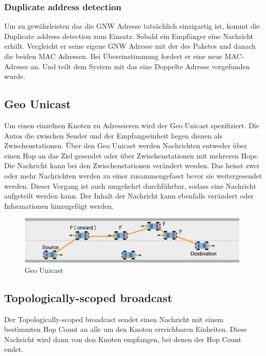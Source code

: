 \subsubsection{Duplicate address detection}
Um zu gewährleisten das die \acl{GNW} Adresse tatsächlich einzigartig ist, kommt die Duplicate address detection zum Einsatz. Sobald ein Empfänger eine Nachricht erhält. Vergleicht er seine eigene \acl{GNW} Adresse mit der des Paketes und danach die beiden MAC Adressen. Bei Übereinstimmung fordert er eine neue MAC-Adresse an. Und teilt dem System mit das eine Doppelte Adresse vorgefunden wurde. \cite{etsi302636-4-1}

\subsection{Geo Unicast}
Um einen einzelnen Knoten zu Adressieren wird der Geo Unicast spezifiziert. Die Autos die zwischen Sender und der Empfangseinheit liegen dienen als Zwischenstationen. Über den Geo Unicast werden Nachrichten entweder über einen Hop an das Ziel gesendet oder über Zwischenstationen mit mehreren Hops. Die Nachricht kann bei den Zwischenstationen verändert werden. Das heisst zwei oder mehr Nachrichten werden zu einer zusammengefasst bevor sie weitergesendet werden. Dieser Vorgang ist auch umgekehrt durchführbar, sodass eine Nachricht aufgeteilt werden kann. Der Inhalt der Nachricht kann ebenfalls verändert oder Informationen hinzugefügt werden. 

\begin{figure}
	\includegraphics[width=0.99\textwidth]{content/images/03_networklayer/GeoUnicast.png}
	\caption{Geo Unicast \cite{etsi102636-1}}
	\label{fig:geounicast}
\end{figure}

\subsection{Topologically-scoped broadcast}
Der Topologically-scoped broadcast sendet einen Nachricht mit einem bestimmten Hop Count an alle um den Knoten erreichbaren Einheiten. Diese Nachricht wird dann von den Knoten empfangen, bei denen der Hop Count endet.


